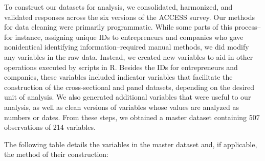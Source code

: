 \documentclass[12pt, letterpaper]{article}
\begin{document}
\vspace{5mm}
To construct our datasets for analysis, we consolidated, harmonized, and validated responses across the six versions of the ACCESS survey. Our methods for data cleaning were primarily programmatic. While some parts of this process--for instance, assigning unique IDs to entrepreneurs and companies who gave nonidentical identifying information--required manual methods, we did modify any variables in the raw data. Instead, we created new variables to aid in other operations executed by scripts in R. Besides the IDs for entrepreneurs and companies, these variables included indicator variables that facilitate the construction of the cross-sectional and panel datasets, depending on the desired unit of analysis. We also generated additional variables that were useful to our analysis, as well as clean versions of variables whose values are analyzed as numbers or dates. From these steps, we obtained a master dataset containing 507 observations of 214 variables.

\vspace{5mm}
The following table details the variables in the master dataset and, if applicable, the method of their construction:
\end{document}
